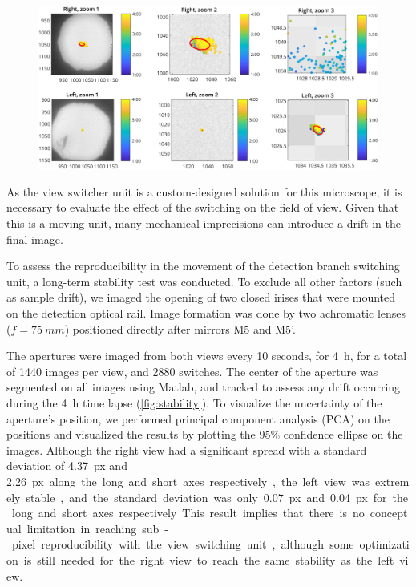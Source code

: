     \begin{figure}
      \centering
      \includegraphics[width=\textwidth]{trackCenter}
      \label{fig:stability}
    \end{figure}

    As the view switcher unit is a custom-designed solution for this microscope, it is necessary to evaluate the effect of the switching on the field of view. Given that this is a moving unit, many mechanical imprecisions can introduce a drift in the final image. 

    To assess the reproducibility in the movement of the detection branch switching unit, a long-term stability test was conducted. To exclude all other factors (such as sample drift), we imaged the opening of two closed irises that were mounted on the detection optical rail. Image formation was done by two achromatic lenses ($f=\SI{75}{mm}$) positioned directly after mirrors M5 and M5'.
    
    The apertures were imaged from both views every 10 seconds, for \SI{4}{h}, for a total of 1440 images per view, and 2880 switches. The center of the aperture was segmented on all images using Matlab, and tracked to assess any drift occurring during the \SI{4}{h} time lapse (\autoref{fig:stability}). To visualize the uncertainty of the aperture's position, we performed principal component analysis (PCA) on the positions and visualized the results by plotting the 95\% confidence ellipse on the images. Although the right view had a significant spread with a standard deviation of \SI{4.37}{px} and \SI{2.26}px along the long and short axes respectively, the left view was extremely stable, and the standard deviation was only \SI{0.07}{px} and \SI{0.04}{px} for the long and short axes respectively. This result implies that there is no conceptual limitation in reaching sub-pixel reproducibility with the view switching unit, although some optimization is still needed for the right view to reach the same stability as the left view.

